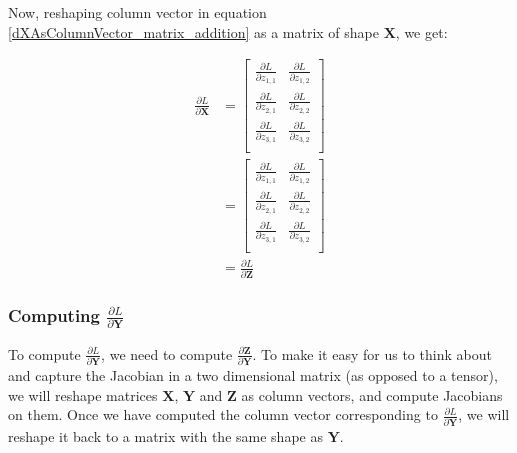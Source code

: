 \documentclass{article}
\newcommand{\matr}[1]{\mathbf{#1}} %
\begin{document}
Now, reshaping column vector in equation \ref{dXAsColumnVector_matrix_addition} as a matrix of shape $\matr{X}$, we get:

\begin{align}
\frac{\partial L}{\partial \matr{X}} &=
\begin{bmatrix}
\frac{\partial L}{\partial z_{1,1}} &
\frac{\partial L}{\partial z_{1,2}} \\[0.7em]
\frac{\partial L}{\partial z_{2,1}} &
\frac{\partial L}{\partial z_{2,2}} \\[0.7em]
\frac{\partial L}{\partial z_{3,1}} &
\frac{\partial L}{\partial z_{3,2}} \\[0.7em]
\end{bmatrix}
\nonumber \\
&=
\begin{bmatrix}
\frac{\partial L}{\partial z_{1,1}} & \frac{\partial L}{\partial z_{1,2}} \\[0.5em]
\frac{\partial L}{\partial z_{2,1}} & \frac{\partial L}{\partial z_{2,2}} \\[0.5em]
\frac{\partial L}{\partial z_{3,1}} & \frac{\partial L}{\partial z_{3,2}} \\[0.5em]
\end{bmatrix}
\nonumber \\
&=
\frac{\partial L}{\partial \matr{Z}}
\end{align}

\subsubsection{Computing $\frac{\partial L}{\partial \matr{Y}}$}
To compute $\frac{\partial L}{\partial \matr{Y}}$, we need to compute $\frac{\partial \matr{Z}}{\partial \matr{Y}}$. To make it easy for us to think about and capture the Jacobian in a two dimensional matrix (as opposed to a tensor), we will reshape matrices $\matr{X}$, $\matr{Y}$ and $\matr{Z}$ as column vectors, and compute Jacobians on them. Once we have computed the column vector corresponding to $\frac{\partial L}{\partial \matr{Y}}$, we will reshape it back to a matrix with the same shape as $\matr{Y}$.
\end{document}
